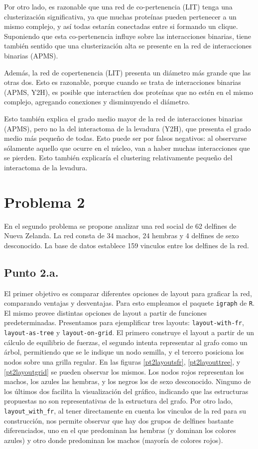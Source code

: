 \documentclass{article}
\begin{document}
Por otro lado, es razonable que una red de co-pertenencia (LIT) tenga una clusterización significativa, ya que muchas proteínas pueden pertenecer a un mismo complejo, y así todas estarán conectadas entre si formando un clique. Suponiendo que esta co-pertenencia influye sobre las interacciones binarias, tiene también sentido que una clusterización alta se presente en la red de interacciones binarias (APMS).

Además, la red de copertenencia (LIT) presenta un diámetro más grande que las otras dos. Esto es razonable, porque cuando se trata de interacciones binarias (APMS, Y2H), es posible que interactúen dos proteínas que no estén en el mismo complejo, agregando conexiones y disminuyendo el diámetro.

Esto también explica el grado medio mayor de la red de interacciones binarias (APMS), pero no la del interactoma de la levadura (Y2H), que presenta el grado medio más pequeño de todas. Esto puede ser por falsos negativos: al observarse sólamente aquello que ocurre en el núcleo, van a haber muchas interacciones que se pierden. Esto también explicaría el clustering relativamente pequeño del interactoma de la levadura.

\section{Problema 2}
En el segundo problema se propone analizar una red social de 62 delfines de Nueva Zelanda. La red consta de 34 machos, 24 hembras y 4 delfines de sexo desconocido. La base de datos establece 159 vinculos entre los delfines de la red.

\subsection{Punto 2.a.}
El primer objetivo es comparar diferentes opciones de layout para graficar la red, comparando ventajas y desventajas. Para esto empleamos el paquete \texttt{igraph} de \texttt{R}. El mismo provee distintas opciones de layout a partir de funciones predeterminadas. Presentamos para ejemplificar tres layouts: \texttt{layout-with-fr}, \texttt{layout-as-tree} y \texttt{layout-on-grid}. El primero construye el layout a partir de un cálculo de equilibrio de fuerzas, el segundo intenta representar al grafo como un árbol, permitiendo que se le indique un nodo semilla, y el tercero posiciona los nodos sobre una grilla regular. En las figuras \ref{pt2layoutsfr}, \ref{pt2layouttree}, y \ref{pt2layoutgrid} se pueden observar los mismos. Los nodos rojos representan los machos, los azules las hembras, y los negros los de sexo desconocido. Ninguno de los últimos dos facilita la visualización del gráfico, indicando que las estructuras propuestas no son representativas de la estructura del grafo. Por otro lado, \texttt{layout\_with\_fr}, al tener directamente en cuenta los vinculos de la red para su construcción, nos permite observar que hay dos grupos de delfines bastante diferenciados, uno en el que predominan las hembras (y dominan los colores azules) y otro donde predominan los machos (mayoría de colores rojos).
\end{document}
